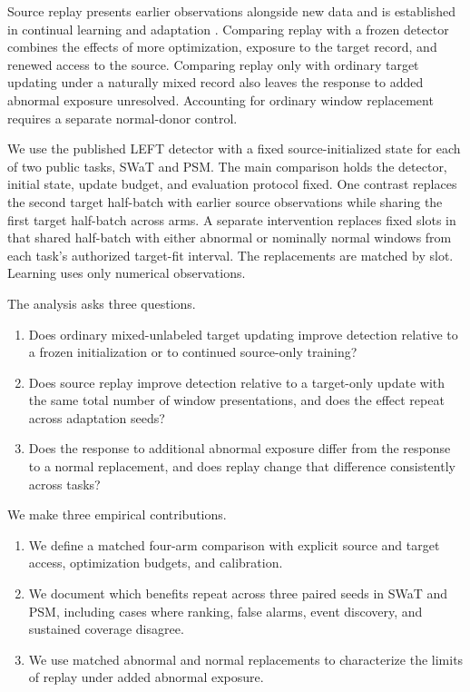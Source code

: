 \documentclass[pdflatex,sn-apa]{sn-jnl}
\providecommand{\tightlist}{\setlength{\itemsep}{0pt}\setlength{\parskip}{0pt}}
\begin{document}
Source replay presents earlier observations alongside new data and is
established in continual learning and adaptation
\citep{rolnick2019, buzzega2020, rostami2021}. Comparing replay with a
frozen detector combines the effects of more optimization, exposure to
the target record, and renewed access to the source. Comparing replay
only with ordinary target updating under a naturally mixed record also
leaves the response to added abnormal exposure unresolved. Accounting
for ordinary window replacement requires a separate normal-donor
control.

We use the published LEFT detector \citep{left2026} with a fixed
source-initialized state for each of two public tasks, SWaT and PSM. The
main comparison holds the detector, initial state, update budget, and
evaluation protocol fixed. One contrast replaces the second target
half-batch with earlier source observations while sharing the first
target half-batch across arms. A separate intervention replaces fixed
slots in that shared half-batch with either abnormal or nominally normal
windows from each task's authorized target-fit interval. The
replacements are matched by slot. Learning uses only numerical
observations.

The analysis asks three questions.

\begin{enumerate}
\def\labelenumi{\arabic{enumi}.}
\tightlist
\item
  Does ordinary mixed-unlabeled target updating improve detection
  relative to a frozen initialization or to continued source-only
  training?
\item
  Does source replay improve detection relative to a target-only update
  with the same total number of window presentations, and does the
  effect repeat across adaptation seeds?
\item
  Does the response to additional abnormal exposure differ from the
  response to a normal replacement, and does replay change that
  difference consistently across tasks?
\end{enumerate}

We make three empirical contributions.

\begin{enumerate}
\def\labelenumi{\arabic{enumi}.}
\tightlist
\item
  We define a matched four-arm comparison with explicit source and
  target access, optimization budgets, and calibration.
\item
  We document which benefits repeat across three paired seeds in SWaT
  and PSM, including cases where ranking, false alarms, event discovery,
  and sustained coverage disagree.
\item
  We use matched abnormal and normal replacements to characterize the
  limits of replay under added abnormal exposure.
\end{enumerate}
\end{document}
